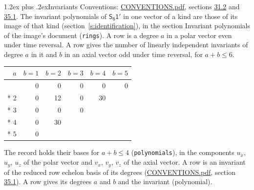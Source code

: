 \documentclass[10pt,a4paper]{article}
\makeatletter
\renewcommand\section{\@startsection{section}{1}{\z@}{-3ex plus -1ex minus -.2ex}%
  {1.2ex plus .2ex}{\normalfont\large\sffamily\bfseries\color{parttitle}}}
\numberwithin{equation}{section}
\newcommand{\grp}[1]{\mathsf{#1}}
\makeatother
\begin{document}
\section{Invariants}\label{s:invariants}
Conventions: \href{../../CONVENTIONS.pdf}{CONVENTIONS.pdf}, sections \href{../../CONVENTIONS.pdf\#conv.31.2}{31.2} and \href{../../CONVENTIONS.pdf\#conv.35.1}{35.1}.
The invariant polynomials of $\grp{S_{6}1'}$ in one vector of a kind are those of its image of that kind (section~\ref{s:identification}), in the section Invariant polynomials of the image's document (\texttt{rings}).
\leavevmode\label{n:index.degree.polar}\label{n:index.degree.axial}A row is a degree $a$ in a polar vector even under time reversal. A row gives the number of linearly independent invariants of degree $a$ in it and $b$ in an axial vector odd under time reversal, for $a + b \le 6$.
{\small\begin{longtable}{@{}rrrrrr@{}}\toprule
$a$ & $b = 1$ & $b = 2$ & $b = 3$ & $b = 4$ & $b = 5$\\\midrule\endhead
\bottomrule\endfoot\endlastfoot
1 & 0 & 0 & 0 & 0 & 0\\*
2 & 0 & 12 & 0 & 30 & \\*
3 & 0 & 0 & 0 &  & \\*
4 & 0 & 30 &  &  & \\*
5 & 0 &  &  &  & \\
\bottomrule\end{longtable}}
\leavevmode\label{n:local.component.polar}\label{n:local.component.axial}The record holds their bases for $a + b \le 4$ (\texttt{polynomials}), in the components $u_{x}$, $u_{y}$, $u_{z}$ of the polar vector and $v_{x}$, $v_{y}$, $v_{z}$ of the axial vector. \label{n:head.polynomial}A row is an invariant of the reduced row echelon basis of its degrees (\href{../../CONVENTIONS.pdf}{CONVENTIONS.pdf}, section \href{../../CONVENTIONS.pdf\#conv.35.1}{35.1}). A row gives its degrees $a$ and $b$ and the invariant (polynomial).
\end{document}
